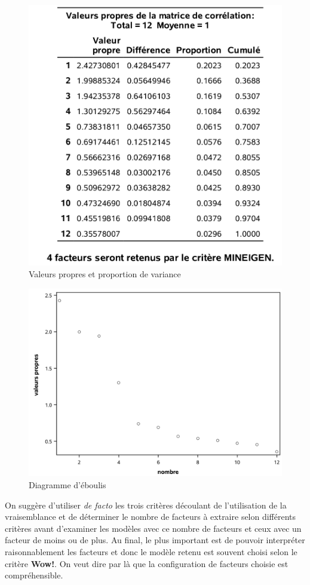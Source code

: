 \documentclass[
  11pt,
  letterpaper,
]{book}
\theoremstyle{definition}
\theoremstyle{definition}
\theoremstyle{definition}
\theoremstyle{remark}
\begin{document}
\begin{figure}

{\centering \includegraphics[width=0.65\linewidth]{figures/01-facto-e7} 

}

\caption{Valeurs propres et proportion de variance}\label{fig:fig1p7}
\end{figure}

\begin{figure}

{\centering \includegraphics[width=0.65\linewidth]{figures/01-facto-e6} 

}

\caption{Diagramme d'éboulis}\label{fig:fig1p6}
\end{figure}

On suggère d'utiliser \emph{de facto} les trois critères découlant de l'utilisation de la vraisemblance et de déterminer le nombre de facteurs à extraire selon différents critères avant d'examiner les modèles avec ce nombre de facteurs et ceux
avec un facteur de moins ou de plus. Au final, le plus important est de pouvoir interpréter raisonnablement les facteurs et donc le modèle retenu est souvent choisi selon le critère \textbf{Wow!}. On veut dire par là que la configuration de facteurs choisie est compréhensible.
\end{document}
